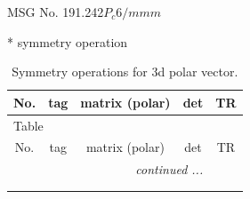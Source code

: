 \documentclass[fleqn,8pt]{jsarticle}
\begin{document}
\setcounter{MaxMatrixCols}{32}

\renewcommand{\tablename}{Table~}
\renewcommand{\figurename}{Figure~}
\begin{center}
\LARGE
MSG No. 191.242\quad$P_{c}6/mmm$
\end{center}
* symmetry operation
\renewcommand{\arraystretch}{1.3}
\begin{longtable}{ccccc}
\caption{Symmetry operations for 3d polar vector.}
 \\
 \hline \hline
No. & tag & matrix (polar) & det & TR \\ \hline \endfirsthead

\multicolumn{4}{l}{\tablename\ \thetable{}} \\
 \hline \hline
No. & tag & matrix (polar) & det & TR \\ \hline \endhead

 \hline \hline
\multicolumn{4}{r}{\footnotesize\it continued ...} \\ \endfoot

 \hline \hline
\multicolumn{4}{r}{} \\ \endlastfoot


\end{longtable}
\end{document}
